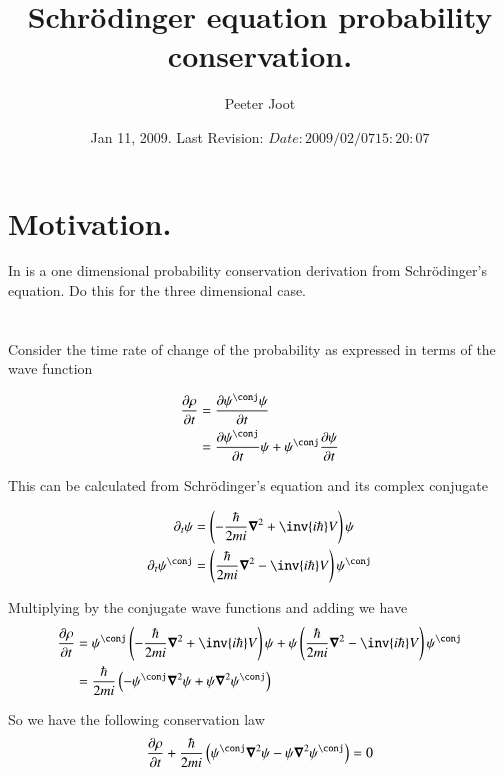 \documentclass{article}
\title{ Schr\"{o}dinger equation probability conservation. }
\author{Peeter Joot}
\date{ Jan 11, 2009.  Last Revision: $Date: 2009/02/07 15:20:07 $ }
\begin{document}
\maketitle{}
\section{ Motivation. }

In \cite{mcmahon2005qmd} is a one dimensional probability conservation
derivation from
Schr\"{o}dinger's equation.  Do this for the three dimensional case.

\section{}

Consider the time rate of change of the probability as expressed 
in terms of the wave function

\begin{align*}
\PD{t}{\rho} 
&= \PD{t}{\psi^\conj \psi} \\
&= \PD{t}{\psi^\conj} \psi + \psi^\conj \PD{t}{\psi} \\
\end{align*}

This can be calculated from Schr\"{o}dinger's equation and its complex
conjugate

\begin{align*}
\partial_t \psi &= \left(-\frac{\hbar}{2mi}\spacegrad^2 + \inv{i\hbar} V \right) \psi \\
\partial_t \psi^\conj &= \left(\frac{\hbar}{2mi}\spacegrad^2 - \inv{i\hbar} V \right) \psi^\conj \\
\end{align*}

Multiplying by the conjugate wave functions and adding we have
\begin{align*}
\PD{t}{\rho}
&=
\psi^\conj \left(-\frac{\hbar}{2mi}\spacegrad^2 + \inv{i\hbar} V \right) \psi +
\psi \left(\frac{\hbar}{2mi}\spacegrad^2 - \inv{i\hbar} V \right) \psi^\conj \\
&=
\frac{\hbar}{2mi} \left(
-\psi^\conj \spacegrad^2 \psi + \psi \spacegrad^2 \psi^\conj \right) \\
\end{align*}

So we have the following conservation law
\begin{align}\label{eqn:intermediate}
\PD{t}{\rho} + \frac{\hbar}{2mi} \left( \psi^\conj \spacegrad^2 \psi - \psi \spacegrad^2 \psi^\conj \right) = 0
\end{align}
\end{document}
